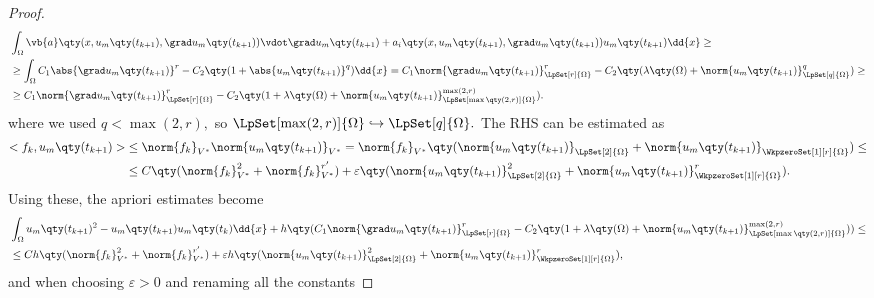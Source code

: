 \begin{proof}
	\begin{align*} 
		&\int_{\Omega}\vb{a}\qty(x, u_m\qty(t_{k+1}), \grad u_m\qty(t_{k+1}))\vdot \grad u_m\qty(t_{k+1}) + a_i\qty(x, u_m\qty(t_{k+1}), \grad u_m\qty(t_{k+1})) u_m\qty(t_{k+1})\dd{x} \geq \\
		&\geq \int_{\Omega}C_1\abs{\grad u_m\qty(t_{k+1})}^r - C_2\qty(1+\abs{u_m\qty(t_{k+1})}^q)\dd{x} = C_1 \norm{\grad u_m\qty(t_{k+1})}_{\LpSet[r]{\Omega}}^r - C_2\qty(\lambda\qty(\Omega) + \norm{u_m\qty(t_{k+1})}_{\LpSet[q]{\Omega}}^q) \geq \\
		&\geq C_1 \norm{\grad u_m\qty(t_{k+1})}_{\LpSet[r]{\Omega}}^r - C_2\qty(1+ \lambda\qty(\Omega) + \norm{u_m\qty(t_{k+1})}_{\LpSet[\max\qty(2,r)]{\Omega}}^{\max(2,r)}).
	\end{align*}
	where we used $q < \max(2,r),$ so $\LpSet[\max(2,r)]{\Omega} \hookrightarrow \LpSet[q]{\Omega}.$ The RHS can be estimated as
	\begin{align*}
		<f_{k}, u_{m}\qty(t_{k+1})> &\leq \norm{f_k}_{V^{*}}\norm{u_m\qty(t_{k+1})}_{V^{*}} = \norm{f_k}_{V^{*}}\qty(\norm{u_m\qty(t_{k+1})}_{\LpSet[2]{\Omega}} + \norm{u_m\qty(t_{k+1})}_{\WkpzeroSet[1][r]{\Omega}}) \leq \\
					    &\leq C\qty(\norm{f_k}_{V^{*}}^{2} + \norm{f_k}_{V^{*}}^{r'}) + \varepsilon \qty(\norm{u_m\qty(t_{k+1})}_{\LpSet[2]{\Omega}}^{2} + \norm{u_m\qty(t_{k+1})}_{\WkpzeroSet[1][r]{\Omega}}^r).
	\end{align*}
	Using these, the apriori estimates become
	\begin{align*}
		&\int_{\Omega} u_m\qty(t_{k+1})^{2} -u_m\qty(t_{k+1}) u_m\qty(t_k)\dd{x} + h\qty(C_1 \norm{\grad u_m\qty(t_{k+1})}_{\LpSet[r]{\Omega}}^r - C_2\qty(1+ \lambda\qty(\Omega) + \norm{u_m\qty(t_{k+1})}_{\LpSet[\max\qty(2,r)]{\Omega}}^{\max(2,r)})) \leq \\
		&\leq Ch\qty(\norm{f_k}_{V^{*}}^{2} + \norm{f_k}_{V^{*}}^{r'}) + \varepsilon h \qty(\norm{u_m\qty(t_{k+1})}_{\LpSet[2]{\Omega}}^{2} + \norm{u_m\qty(t_{k+1})}_{\WkpzeroSet[1][r]{\Omega}}^r),
	\end{align*}
	and when choosing $\varepsilon > 0$ and renaming all the constants


\end{proof}

